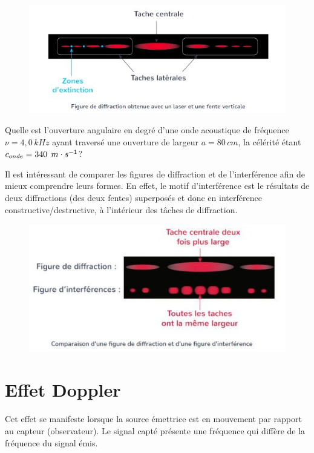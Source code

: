 \documentclass[11pt,a4paper]{article}
\begin{document}
\begin{figure}[H]
    \centering
    \includegraphics[width=0.9\linewidth]{imgs/p5/motifDiff2.jpg}
\end{figure}
\begin{exo} Quelle est l’ouverture angulaire en degré d’une onde acoustique de fréquence $\nu=4,0\, kHz$ ayant traversé une ouverture de largeur $a=80\, cm$, la célérité étant $c_{onde}=340\, \; m\cdot s^{-1}$?
\vspace{3.5cm}
\end{exo}
Il est intéressant de comparer les figures de diffraction et de l'interférence afin de mieux comprendre leurs formes. En effet, le motif d'interférence est le résultats de deux diffractions (des deux fentes) superposés et donc en interférence constructive/destructive, à l'intérieur des tâches de diffraction. 

\begin{figure}[H]
    \centering
    \includegraphics[width=.9\linewidth]{imgs/p5/interfereDIFF.jpg}
\end{figure}
\newpage
\section{Effet Doppler}

Cet effet se manifeste lorsque la source émettrice est en mouvement par rapport au capteur (observateur).  Le signal capté présente une fréquence qui diffère de la fréquence du signal émis. 
\end{document}
